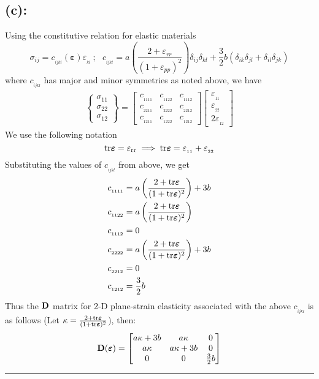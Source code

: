 \subsection*{(c): }
Using the constitutive relation for elastic materials
\[
\sigma_{ij} = 
c_{_{ijkl}}({\bm\varepsilon})\varepsilon_{_{kl}}\ ; \ \ \ c_{_{ijkl}} = a\left(
\frac{2+\varepsilon_{rr}}{(1+\varepsilon_{pp})^2}
\right)\delta_{ij}\delta_{kl}
+\frac{3}{2}b(\delta_{ik}\delta_{jl}+\delta_{il}\delta_{jk}) 
\]
where $c_{_{ijkl}}$ has major and minor symmetries as noted above, we have 
\begin{align*}
\begin{Bmatrix}
\sigma_{11} \\ \sigma_{22} \\ \sigma_{12}
\end{Bmatrix}
=
\begin{bmatrix}
c_{_{1111}} & c_{_{1122}} & c_{_{1112}} \\
c_{_{2211}} & c_{_{2222}} & c_{_{2212}}\\
c_{_{1211}} & c_{_{1222}} & c_{_{1212}} 
\end{bmatrix}
\begin{bmatrix}
\varepsilon_{_{11}} \\ \varepsilon_{_{22}} \\ 2\varepsilon_{_{12}}
\end{bmatrix}
\end{align*}
We use the following notation 
\[
\rm tr{\bm\varepsilon} = \varepsilon_{rr} \implies \rm tr{\bm\varepsilon} = \varepsilon_{_{11}}+\varepsilon_{_{22}}
\]
Substituting the values of $c_{_{ijkl}}$ from above, we get
\begin{align*}
c_{_{1111}} & = 
a\left(
\frac{2+\rm tr{\bm\varepsilon}}{(1+\rm tr{\bm\varepsilon})^2} \right)+
3b \\
c_{_{1122}} & = 
a\left(
\frac{2+\rm tr{\bm\varepsilon}}{(1+\rm tr{\bm\varepsilon})^2} \right) \\
c_{_{1112}} & = 
0\\
c_{_{2222}}
& = 
a\left(
\frac{2+\rm tr{\bm\varepsilon}}{(1+\rm tr{\bm\varepsilon})^2} \right)+
3b\\
c_{_{2212}}
& = 
0\\
c_{_{1212}}& = 
\frac{3}{2}b 
\end{align*}
Thus the $\bf D$ matrix for 2-D plane-strain elasticity associated with the above $c_{_{ijkl}}$ is as follows (Let $\kappa = \frac{2+\rm tr{\bm\varepsilon}}{(1+\rm tr{\bm\varepsilon})^2}$), then: 
\[
{\bf D}(\bm\varepsilon)
=
\begin{bmatrix}
a\kappa +
3b
& a\kappa 
& 0 \\
a\kappa 
& a\kappa+
3b
& 0 \\
0
& 0
& 
\frac{3}{2}b
\end{bmatrix}
\]\hrule
